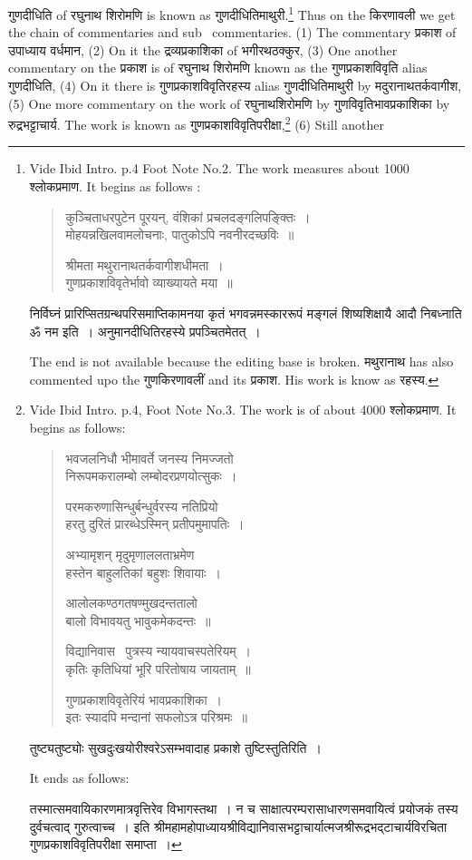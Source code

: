 \documentclass[11pt, openany]{book}
\begin{document}
\newpage
\noindent
गुणदीधिति of रघुनाथ शिरोमणि is known as गुणदीधितिमाथुरी.\renewcommand{\thefootnote}{1}\footnote{Vide Ibid Intro. p.4 Foot Note No.2. The work measures about 1000 श्लोकप्रमाण. It begins as follows : \textendash
\begin{quote}
{\qt कुञ्चिताधरपुटेन पूरयन्, वंशिकां प्रचलदङ्गलिपङ्क्तिः~।\\
मोहयन्नखिलवामलोचनाः, पातुकोऽपि नवनीरदच्छविः~॥

श्रीमता मथुरानाथतर्कवागीशधीमता~।\\
गुणप्रकाशविवृतेर्भावो व्याख्यायते मया~॥}
\end{quote}
निर्विघ्नं प्रारिप्सितग्रन्थपरिसमाप्तिकामनया कृतं भगवन्नमस्काररूपं मङ्गलं शिष्यशिक्षायै आदौ निबध्नाति ॐ नम इति~। अनुमानदीधितिरहस्ये प्रपञ्चितमेतत्~।

The end is not available because the editing base is broken. मथुरानाथ has also commented upo the गुणकिरणावलीं and its प्रकाश. His work is know as रहस्य.} Thus on the किरणावली we get the chain of commentaries and sub \textendash\ commentaries. (1) The commentary प्रकाश of उपाध्याय वर्धमान, (2) On it the द्रव्यप्रकाशिका of भगीरथठक्कुर, (3) One another commentary on the प्रकाश is of रघुनाथ शिरोमणि known as the गुणप्रकाशविवृति alias गुणदीधिति, (4) On it there is गुणप्रकाशविवृतिरहस्य alias गुणदीधितिमाथुरी by मदुरानाथतर्कवागीश, (5) One more commentary on the work of रघुनाथशिरोमणि by गुणविवृतिभावप्रकाशिका by रुद्रभट्टाचार्य. The work is known as गुणप्रकाशविवृतिपरीक्षा,\renewcommand{\thefootnote}{2}\footnote{Vide Ibid Intro. p.4, Foot Note No.3. The work is of about 4000 श्लोकप्रमाण. It begins as follows: \textendash

\begin{quote}
{\qt भवजलनिधौ भीमावर्ते जनस्य निमज्जतो\\
निरूपमकरालम्बो लम्बोदरप्रणयोत्सुकः~।

परमकरुणासिन्धुर्बन्धुर्वरस्य नतिप्रियो\\
हरतु दुरितं प्रारब्धेऽस्मिन् प्रतीपमुमापतिः~।

अभ्यामृशन् मृदुमृणाललताभ्रमेण\\
हस्तेन बाहुलतिकां बहुशः शिवायाः~।

आलोलकण्ठगतषण्मुखदन्ततालो\\
बालो विभावयतु भावुकमेकदन्तः~॥

विद्यानिवास \textendash\ पुत्रस्य न्यायवाचस्पतेरियम्~।\\
कृतिः कृतिधियां भूरि परितोषाय जायताम्~॥

गुणप्रकाशविवृतेरियं भावप्रकाशिका~।\\
इतः स्यादपि मन्दानां सफलोऽत्र परिश्रमः~॥}
\end{quote}

तुष्ट्यतुष्ट्योः सुखदुःखयोरीश्वरेऽसम्भवादाह प्रकाशे तुष्टिस्तुतिरिति~।

It ends as follows: \textendash

तस्मात्समवायिकारणमात्रवृत्तिरेव विभागस्तथा~। न च साक्षात्परम्परासाधारणसमवायित्वं प्रयोजकं तस्य दुर्वचत्वाद् गुरुत्वाच्च~। इति श्रीमहामहोपाध्यायश्रीविद्यानिवासभट्टाचार्यात्मजश्रीरूद्रभद्टाचार्यविरचिता गुणप्रकाशविवृतिपरीक्षा समाप्ता~।} (6) Still another
\end{document}

